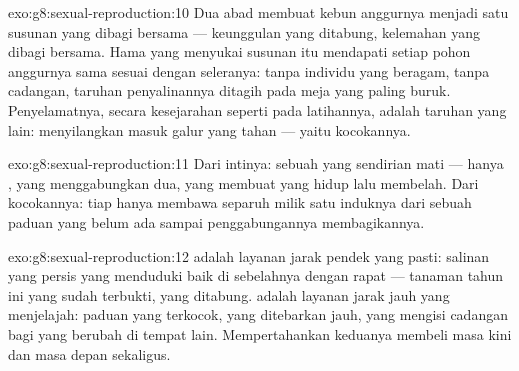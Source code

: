 \begin{solution}{exo:g8:sexual-reproduction:10}
Dua abad  membuat kebun anggurnya menjadi satu susunan yang dibagi
bersama --- keunggulan yang ditabung, kelemahan yang dibagi bersama.
Hama yang menyukai susunan itu mendapati setiap pohon anggurnya sama
sesuai dengan seleranya: tanpa individu yang beragam, tanpa cadangan,
taruhan penyalinannya ditagih pada meja yang paling buruk. Penyelamatnya,
secara kesejarahan seperti pada latihannya, adalah taruhan yang lain:
menyilangkan masuk galur yang tahan --- yaitu kocokannya.
\end{solution}

\begin{solution}{exo:g8:sexual-reproduction:11}
Dari intinya: sebuah  yang sendirian mati --- hanya ,
yang menggabungkan dua, yang membuat  yang hidup lalu membelah.
Dari kocokannya: tiap  hanya membawa separuh milik satu induknya
dari sebuah paduan yang belum ada sampai penggabungannya membagikannya.
\end{solution}

\begin{solution}{exo:g8:sexual-reproduction:12}
 adalah layanan jarak pendek yang pasti: salinan yang persis
yang menduduki  baik di sebelahnya dengan rapat --- tanaman tahun
ini yang sudah terbukti, yang ditabung.  adalah layanan jarak
jauh yang menjelajah: paduan yang terkocok, yang ditebarkan jauh, yang
mengisi cadangan  bagi  yang berubah di tempat lain.
Mempertahankan keduanya membeli masa kini dan masa depan sekaligus.
\end{solution}


